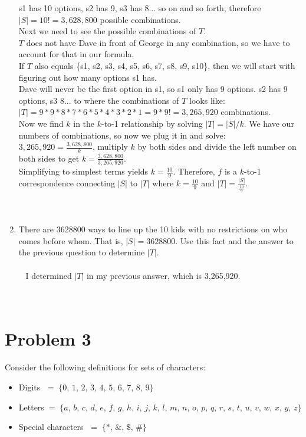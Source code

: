 \documentclass{amsart}
\theoremstyle{definition}
\theoremstyle{Exercise}
\theoremstyle{remark}
\theoremstyle{rule}
\numberwithin{equation}{section}
\begin{document}
\begin{enumerate}[label=(\alph*)]
s1 has 10 options, s2 has 9, s3 has 8... so on and so forth, therefore $|S| = 10! = 3,628,800$ possible combinations.\\
Next we need to see the possible combinations of $T$.\\
$T$ does not have Dave in front of George in any combination, so we have to account for that in our formula.\\
If $T$ also equals \{s1, s2, s3, s4, s5, s6, s7, s8, s9, s10\}, then we will start with figuring out how many options s1 has.\\
Dave will never be the first option in s1, so s1 only has 9 options. s2 has 9 options, s3 8... to where the combinations of $T$ looks like:\\ 
$|T| = 9 * 9 * 8 * 7 * 6 * 5* 4 * 3 * 2 * 1 = 9 * 9! = 3,265,920$ combinations.\\
Now we find $k$ in the $k$-to-1 relationship by solving $|T| = |S|/k$. We have our numbers of combinations, so now we plug it in and solve:\\
$3,265,920 = \frac{3,628,800}{k}$, multiply $k$ by both sides and divide the left number on both sides to get $k = \frac{3,628,800}{3,265,920}$.\\
Simplifying to simplest terms yields $k = \frac{10}{9}$. Therefore, $f$ is a $k$-to-1 correspondence connecting $|S|$ to $|T|$ where $k = \frac{10}{9}$ and $|T| = \frac{|S|}{\frac{10}{9}}$.
\\\\\
  \item There are 3628800 ways to line up the 10 kids with no restrictions on who comes before whom. That is, $|S| =3628800$. Use this fact and the answer to the previous question to determine $|T|$.\\\\\
I determined $|T|$ in my previous answer, which is 3,265,920.
\\\\\
\end{enumerate}

   
   \newpage

\section*{Problem 3}
   
   
\item Consider the following definitions for sets of characters:
\begin{itemize}
  \item Digits $\;=\; \{ 0,\, 1,\, 2,\, 3,\, 4,\, 5,\, 6,\, 7,\, 8,\, 9 \}$\\
  \item Letters$\; = \;\{ a,\, b,\, c, \,d,\, e,\, f,\, g,\, h,\, i,\, j,\, k,\, l,\, m,\, n,\, o,\, p,\, q,\, r,\, s,\, t,\, u,\, v,\, w,\, x,\, y,\, z \}$\\
  \item Special characters $\;=\; \{ *,\, \&,\, \$,\, \# \}$\\
\end{itemize}
\end{document}
